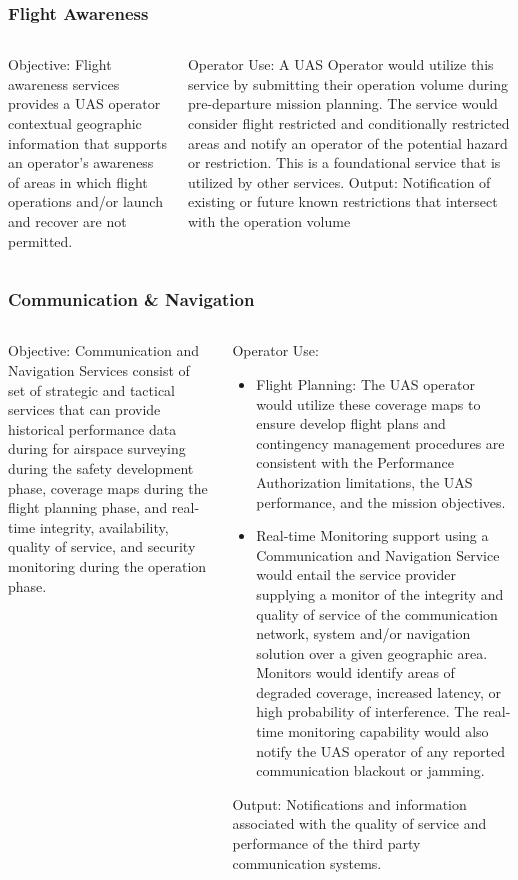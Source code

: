 \documentclass[usenames,dvipsnames,aspectratio=169,serif]{beamer}
\begin{document}
\begin{frame}
   \frametitle{Flight Awareness}
   \begin{columns}[t]
      \begin{column}{0.5\textwidth}
         Objective: Flight awareness services provides a UAS operator contextual geographic information that supports an operator's awareness of areas in which flight operations and/or launch and recover are not permitted.
      \end{column}
      \begin{column}{0.5\textwidth}
         Operator Use: A UAS Operator would utilize this service by submitting their operation volume during pre-departure mission planning. The service would consider flight restricted and conditionally restricted areas and notify an operator of the potential hazard or restriction. This is a foundational service that is utilized by other services.
         Output: Notification of existing or future known restrictions that intersect with the operation volume
      \end{column}
   \end{columns}
\end{frame}

\begin{frame}
   \frametitle{Communication \& Navigation}
   \begin{columns}[t]
      \begin{column}{0.5\textwidth}
         Objective: Communication and Navigation Services consist of set of strategic and tactical services that can provide historical performance data during for airspace surveying during the safety development phase, coverage maps during the flight planning phase, and real-time integrity, availability, quality of service, and security monitoring during the operation phase.
      \end{column}
      \begin{column}{0.5\textwidth}
         Operator Use:
         \begin{itemize}
            \item  Flight Planning: The UAS operator would utilize these coverage maps to ensure develop flight plans and contingency management procedures are consistent with the Performance Authorization limitations, the UAS performance, and the mission objectives.
            \item  Real-time Monitoring support using a Communication and Navigation Service would entail the service provider supplying a monitor of the integrity and quality of service of the communication network, system and/or navigation solution over a given geographic area. Monitors would identify areas of degraded coverage, increased latency, or high probability of interference. The real-time monitoring capability would also notify the UAS operator of any reported communication blackout or jamming.
         \end{itemize}
         Output: Notifications and information associated with the quality of service and performance of the third party communication systems.
      \end{column}
   \end{columns}
\end{frame}
\end{document}
